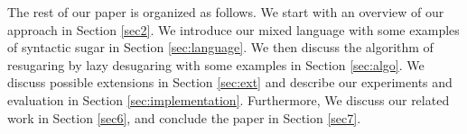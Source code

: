 The rest of our paper is organized as follows. We start with an overview of our approach in Section \ref{sec2}. We introduce our mixed language with some examples of syntactic sugar in Section \ref{sec:language}. We then discuss the algorithm of resugaring by lazy desugaring with some examples in Section \ref{sec:algo}. We discuss possible extensions in Section \ref{sec:ext} and describe our experiments and evaluation in Section \ref{sec:implementation}. Furthermore,  We discuss our related work in Section \ref{sec6}, and conclude the paper in Section \ref{sec7}.

